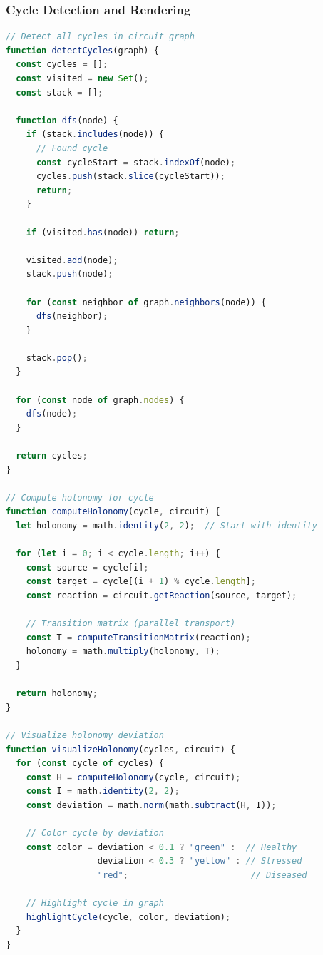 \documentclass[12pt,a4paper]{article}
\begin{document}
\subsubsection{Cycle Detection and Rendering}

\begin{lstlisting}[language=JavaScript, basicstyle=\ttfamily\small]
// Detect all cycles in circuit graph
function detectCycles(graph) {
  const cycles = [];
  const visited = new Set();
  const stack = [];
  
  function dfs(node) {
    if (stack.includes(node)) {
      // Found cycle
      const cycleStart = stack.indexOf(node);
      cycles.push(stack.slice(cycleStart));
      return;
    }
    
    if (visited.has(node)) return;
    
    visited.add(node);
    stack.push(node);
    
    for (const neighbor of graph.neighbors(node)) {
      dfs(neighbor);
    }
    
    stack.pop();
  }
  
  for (const node of graph.nodes) {
    dfs(node);
  }
  
  return cycles;
}

// Compute holonomy for cycle
function computeHolonomy(cycle, circuit) {
  let holonomy = math.identity(2, 2);  // Start with identity
  
  for (let i = 0; i < cycle.length; i++) {
    const source = cycle[i];
    const target = cycle[(i + 1) % cycle.length];
    const reaction = circuit.getReaction(source, target);
    
    // Transition matrix (parallel transport)
    const T = computeTransitionMatrix(reaction);
    holonomy = math.multiply(holonomy, T);
  }
  
  return holonomy;
}

// Visualize holonomy deviation
function visualizeHolonomy(cycles, circuit) {
  for (const cycle of cycles) {
    const H = computeHolonomy(cycle, circuit);
    const I = math.identity(2, 2);
    const deviation = math.norm(math.subtract(H, I));
    
    // Color cycle by deviation
    const color = deviation < 0.1 ? "green" :  // Healthy
                  deviation < 0.3 ? "yellow" : // Stressed
                  "red";                        // Diseased
    
    // Highlight cycle in graph
    highlightCycle(cycle, color, deviation);
  }
}
\end{lstlisting}
\end{document}
